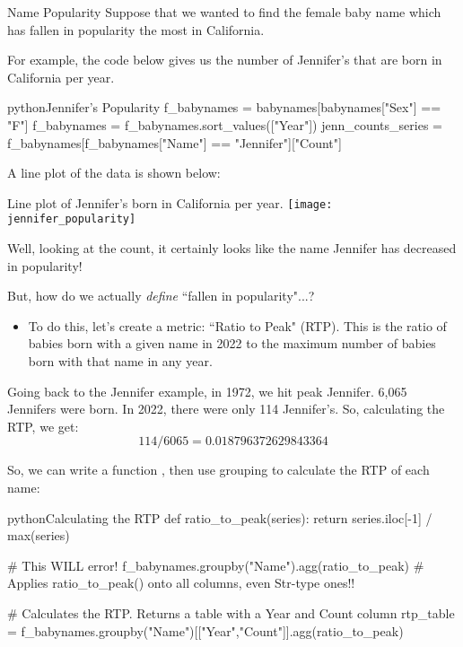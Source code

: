 \documentclass[openany]{book}
\begin{document}
\begin{casestudy*}{Name Popularity}{}
Suppose that we wanted to find the female baby name which has fallen in popularity the most in California.

For example, the code below gives us the number of Jennifer's that are born in California per year.
\begin{code}{python}{Jennifer's Popularity}
f_babynames = babynames[babynames["Sex"] == "F"]
f_babynames = f_babynames.sort_values(["Year"])
jenn_counts_series = f_babynames[f_babynames["Name"] == "Jennifer"]["Count"]
\end{code}

A line plot of the data is shown below:
\begin{figurebox}[nofloat]{Line plot of Jennifer's born in California per year.}
	\centering\texttt{[image: jennifer\_popularity]}
\end{figurebox}

Well, looking at the count, it certainly looks like the name Jennifer has decreased in popularity!

But, how do we actually \textit{define} ``fallen in popularity"...?
\begin{itemize}
	\item To do this, let's create a metric: ``Ratio to Peak" (RTP). This is the ratio of babies born with a given name in 2022 to the maximum number of babies born with that name in any year. 
\end{itemize}

Going back to the Jennifer example, in 1972, we hit peak Jennifer. 6,065 Jennifers were born. In 2022, there were only 114 Jennifer's. So, calculating the RTP, we get:
\begin{equation*}
	114/6065 = 0.018796372629843364
\end{equation*}

So, we can write a function , then use grouping to calculate the RTP of each name:
\begin{code}{python}{Calculating the RTP}
def ratio_to_peak(series):
  return series.iloc[-1] / max(series)

# This WILL error!
f_babynames.groupby("Name").agg(ratio_to_peak) # Applies ratio_to_peak() onto all columns, even Str-type ones!!

# Calculates the RTP. Returns a table with a Year and Count column
rtp_table = f_babynames.groupby("Name")[["Year","Count"]].agg(ratio_to_peak)


\end{code}
\end{casestudy*}
\end{document}
